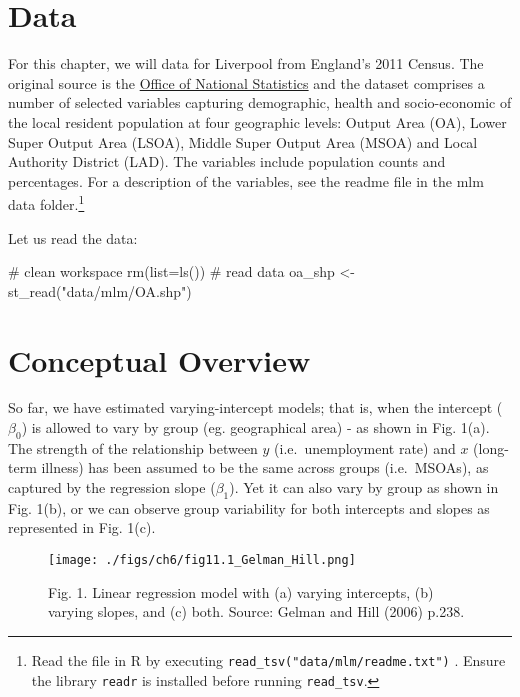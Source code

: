 \documentclass[
  letterpaper,
  krantz2]{style/krantz}
\newenvironment{Shaded}{\begin{snugshade}}{\end{snugshade}}
\newcommand{\AttributeTok}[1]{\textcolor[rgb]{0.40,0.45,0.13}{#1}}
\newcommand{\CommentTok}[1]{\textcolor[rgb]{0.37,0.37,0.37}{#1}}
\newcommand{\FunctionTok}[1]{\textcolor[rgb]{0.28,0.35,0.67}{#1}}
\newcommand{\NormalTok}[1]{\textcolor[rgb]{0.00,0.23,0.31}{#1}}
\newcommand{\OtherTok}[1]{\textcolor[rgb]{0.00,0.23,0.31}{#1}}
\newcommand{\StringTok}[1]{\textcolor[rgb]{0.13,0.47,0.30}{#1}}
\begin{document}
\hypertarget{data-5}{%
\section{Data}\label{data-5}}

For this chapter, we will data for Liverpool from England's 2011 Census.
The original source is the
\href{https://www.nomisweb.co.uk/home/census2001.asp}{Office of National
Statistics} and the dataset comprises a number of selected variables
capturing demographic, health and socio-economic of the local resident
population at four geographic levels: Output Area (OA), Lower Super
Output Area (LSOA), Middle Super Output Area (MSOA) and Local Authority
District (LAD). The variables include population counts and percentages.
For a description of the variables, see the readme file in the mlm data
folder.\footnote{Read the file in R by executing
  \texttt{read\_tsv("data/mlm/readme.txt")} . Ensure the library
  \texttt{readr} is installed before running \texttt{read\_tsv}.}

Let us read the data:

\begin{Shaded}
\begin{Highlighting}[]
\CommentTok{\# clean workspace}
\FunctionTok{rm}\NormalTok{(}\AttributeTok{list=}\FunctionTok{ls}\NormalTok{())}
\CommentTok{\# read data}
\NormalTok{oa\_shp }\OtherTok{\textless{}{-}} \FunctionTok{st\_read}\NormalTok{(}\StringTok{"data/mlm/OA.shp"}\NormalTok{)}
\end{Highlighting}
\end{Shaded}

\hypertarget{conceptual-overview}{%
\section{Conceptual Overview}\label{conceptual-overview}}

So far, we have estimated varying-intercept models; that is, when the
intercept (\(\beta_{0}\)) is allowed to vary by group (eg. geographical
area) - as shown in Fig. 1(a). The strength of the relationship between
\(y\) (i.e.~unemployment rate) and \(x\) (long-term illness) has been
assumed to be the same across groups (i.e.~MSOAs), as captured by the
regression slope (\(\beta_{1}\)). Yet it can also vary by group as shown
in Fig. 1(b), or we can observe group variability for both intercepts
and slopes as represented in Fig. 1(c).

\begin{figure}

{\centering \texttt{[image: ./figs/ch6/fig11.1\_Gelman\_Hill.png]}

}

\caption{Fig. 1. Linear regression model with (a) varying intercepts,
(b) varying slopes, and (c) both. Source: Gelman and Hill (2006) p.238.}

\end{figure}
\end{document}
